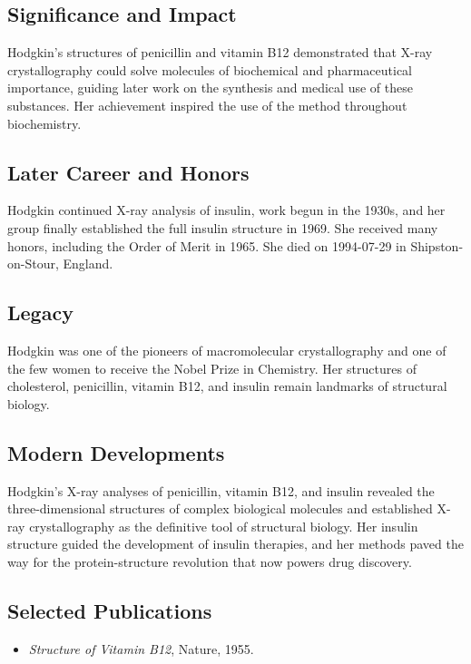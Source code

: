 \subsection*{Significance and Impact}

Hodgkin's structures of penicillin and vitamin B12 demonstrated that X-ray crystallography could solve molecules of biochemical and pharmaceutical importance, guiding later work on the synthesis and medical use of these substances. Her achievement inspired the use of the method throughout biochemistry.

\subsection*{Later Career and Honors}

Hodgkin continued X-ray analysis of insulin, work begun in the 1930s, and her group finally established the full insulin structure in 1969. She received many honors, including the Order of Merit in 1965. She died on 1994-07-29 in Shipston-on-Stour, England.

\subsection*{Legacy}

Hodgkin was one of the pioneers of macromolecular crystallography and one of the few women to receive the Nobel Prize in Chemistry. Her structures of cholesterol, penicillin, vitamin B12, and insulin remain landmarks of structural biology.

\subsection*{Modern Developments}

Hodgkin's X-ray analyses of penicillin, vitamin B12, and insulin revealed the three-dimensional structures of complex biological molecules and established X-ray crystallography as the definitive tool of structural biology. Her insulin structure guided the development of insulin therapies, and her methods paved the way for the protein-structure revolution that now powers drug discovery.

\subsection*{Selected Publications}

\begin{itemize}

\item \emph{Structure of Vitamin B12}, Nature, 1955.

\end{itemize}

